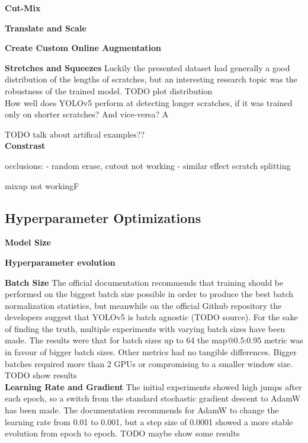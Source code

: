 \textbf{Cut-Mix}



\textbf{Translate and Scale}

\textbf{Create Custom Online Augmentation}

\textbf{Stretches and Squeezes}
Luckily the presented dataset had generally a good distribution of the lengths of scratches, but an interesting research topic was the robustness of the trained model.
TODO plot distribution \\

 How well does YOLOv5 perform at detecting longer scratches, if it was trained only on shorter scratches? And vice-versa? A


TODO talk about artifical examples?? \\

\textbf{Constrast}



occlusions:
  - random erase, cutout not working
  - similar effect scratch splitting

mixup not workingF



\subsection{Hyperparameter Optimizations}

\textbf{Model Size}

\textbf{Hyperparameter evolution}

\textbf{Batch Size}
The official documentation recommends that training should be performed on the biggest batch size possible in order to produce the best batch normalization statistics, but meanwhile on the official Github repository the developers suggest that YOLOv5 is batch agnostic (TODO source). For the sake of finding the truth, multiple experiments with varying batch sizes have been made. The results were that for batch sizes up to 64 the map@0.5:0.95 metric was in favour of bigger batch sizes. Other metrics had no tangible differences. Bigger batches required more than 2 GPUs or compromising to a smaller window size. \\
TODO show results \\

\textbf{Learning Rate and Gradient}
The initial experiments showed high jumps after each epoch, so a switch from the standard stochastic gradient descent to AdamW has been made. The documentation recommends for AdamW to change the learning rate from 0.01 to 0.001, but a step size of 0.0001 showed a more stable evolution from epoch to epoch.
TODO maybe show some results

